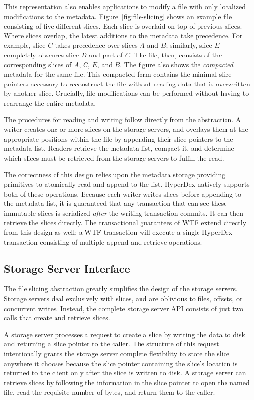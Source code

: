 \documentclass[twocolumn,10pt,letterpaper]{article}
\begin{document}
This representation also enables applications to modify a file with only
localized modifications to the metadata.  Figure~\ref{fig:file-slicing} shows an
example file consisting of five different slices.  Each slice is overlaid on top
of previous slices.  Where slices overlap, the latest additions to the metadata
take precedence.  For example, slice $C$ takes precedence over slices $A$ and
$B$; similarly, slice $E$ completely obscures slice $D$ and part of $C$.  The
file, then, consists of the corresponding slices of $A$, $C$, $E$, and $B$.  The
figure also shows the {\em compacted} metadata for the same file.  This
compacted form contains the minimal slice pointers necessary to reconstruct the
file without reading data that is overwritten by another slice.  Crucially, file
modifications can be performed without having to rearrange the entire metadata.

The procedures for reading and writing follow directly from the abstraction.  A
writer creates one or more slices on the storage servers, and overlays them at
the appropriate positions within the file by appending their slice pointers to
the metadata list.  Readers retrieve the metadata list, compact it, and
determine which slices must be retrieved from the storage servers to fulfill the
read.

The correctness of this design relies upon the metadata storage providing
primitives to atomically read and append to the list.  HyperDex natively
supports both of these operations.  Because each writer writes slices before
appending to the metadata list, it is guaranteed that any transaction that can
see these immutable slices is serialized {\em after} the writing transaction
commits.  It can then retrieve the slices directly.  The transactional
guarantees of WTF extend directly from this design as well:  a WTF transaction
will execute a single HyperDex transaction consisting of multiple append and
retrieve operations.

\subsection{Storage Server Interface}

The file slicing abstraction greatly simplifies the design of the storage
servers.  Storage servers deal exclusively with slices, and are oblivious to
files, offsets, or concurrent writes.  Instead, the complete storage server API
consists of just two calls that create and retrieve slices.

A storage server processes a request to create a slice by writing the data to
disk and returning a slice pointer to the caller.  The structure of this request
intentionally grants the storage server complete flexibility to store the slice
anywhere it chooses because the slice pointer containing the slice's location is
returned to the client only after the slice is written to disk.  A storage
server can retrieve slices by following the information in the slice pointer to
open the named file, read the requisite number of bytes, and return them to the
caller.
\end{document}
